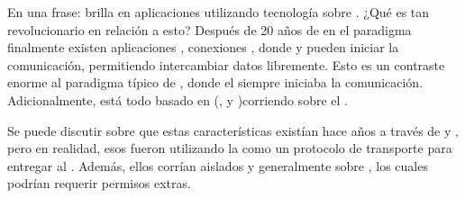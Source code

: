 


En una frase: \nodejsNAME brilla en aplicaciones \webINT \realTimeINT utilizando tecnología \pushINT sobre \websocketsINT. ¿Qué es tan revolucionario en relación a esto? Después de 20 años de \statelessWebINT en el paradigma \requestResponseINT finalmente existen aplicaciones \webINT \realTimeINT, conexiones \twoWayINT, donde \clientAS y \serverAS pueden iniciar la comunicación, permitiendo intercambiar datos libremente. Esto es un contraste enorme al paradigma típico de \webResponseINT, donde el \clientAS siempre iniciaba la comunicación. Adicionalmente, está todo basado en \openWebStackINT (\htmlNAME, \cssNAME y \javaScriptNAME )corriendo sobre el .

Se puede discutir sobre que estas características existían hace años a través de \flashNAME y \javaAppletsINT, pero en realidad, esos fueron \sandboxedEnvPL utilizando la \webINT como un protocolo de transporte para entregar al \clientAS. Además, ellos corrían aislados y generalmente sobre \nonStandardPortsINT, los cuales podrían requerir permisos extras.

